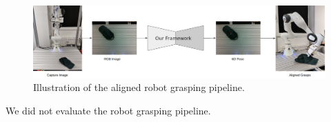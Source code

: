 \begin{figure}[htb]
    \centering
    \includegraphics[scale=0.17]{images/aligned.png}
    \caption{Illustration of the aligned robot grasping pipeline.}
    \label{fig:aligned_grasp}
\end{figure}

We did not evaluate the robot grasping pipeline.